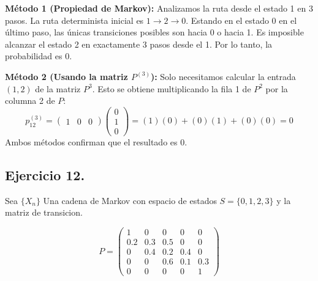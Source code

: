 \documentclass[10pt,a4paper]{book}
\begin{document}
\begin{itemize}
    \textbf{Método 1 (Propiedad de Markov):} Analizamos la ruta desde el estado 1 en 3 pasos.
    La ruta determinista inicial es $1 \to 2 \to 0$. Estando en el estado 0 en el último paso, las únicas transiciones posibles son hacia 0 o hacia 1. Es imposible alcanzar el estado 2 en exactamente 3 pasos desde el 1. Por lo tanto, la probabilidad es $0$.
    
    \textbf{Método 2 (Usando la matriz $P^{(3)}$):} 
    Solo necesitamos calcular la entrada $(1, 2)$ de la matriz $P^3$. Esto se obtiene multiplicando la fila 1 de $P^2$ por la columna 2 de $P$:
    \[ p_{12}^{(3)} = \begin{pmatrix} 1 & 0 & 0 \end{pmatrix} \begin{pmatrix} 0 \\ 1 \\ 0 \end{pmatrix} = (1)(0) + (0)(1) + (0)(0) = 0 \]
    Ambos métodos confirman que el resultado es $0$.
\end{itemize}

\newpage

\subsection*{Ejercicio 12.} Sea \(\{ X_{n}\}\) Una cadena de Markov con espacio de estados \(S=\{0,1,2,3\}\) y la matriz de transicion.

\vspace{0.2cm}

\[ P = \begin{pmatrix} 
1   &  0   & 0   & 0 & 0  \\ 
0.2 & 0.3  & 0.5 & 0 & 0  \\
0   & 0.4  & 0.2 & 0.4 & 0  \\
0   &  0   & 0.6 & 0.1 & 0.3  \\
0  &  0 & 0 & 0 & 1  
\end{pmatrix} \]

\vspace{0.2cm}
\end{document}
